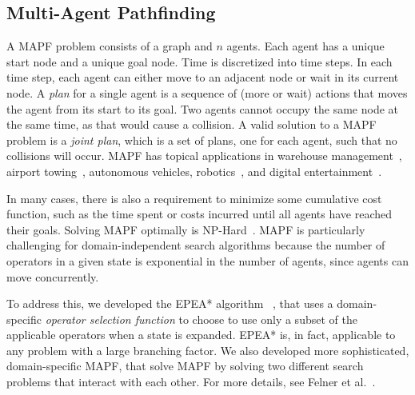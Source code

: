 \documentclass{article}
\newcommand{\astar}{A$^*$\xspace}
\newcommand{\epea}{\ac{EPEA*}\xspace}
\newcommand{\mapf}{\ac{MAPF}\xspace}
\begin{document}
\subsection{Multi-Agent Pathfinding}


A \mapf problem consists of a graph and $n$ agents. Each agent has a unique start node and a unique goal node. Time is discretized into time steps. In each time step, each agent can either move to an adjacent node or wait in its current node. A \emph{plan} for a single agent is a sequence of (more or wait) actions that moves the agent from its start  to its goal.  Two agents cannot occupy the same node at the same time, as that would cause a collision. 
A valid solution to a \mapf problem is a \emph{joint plan}, which is a 
set of plans, one for each agent, such that no collisions will occur. 
\mapf has topical applications in warehouse management~\cite{wurman2008coordinating}, airport towing~\cite{morris2016planning}, autonomous vehicles, robotics~\cite{veloso2015cobots}, and digital entertainment~\cite{ma2017feasibility}.


In many cases, there is also a requirement to minimize some cumulative cost function, such as the time spent or costs incurred until all agents have reached their goals. Solving \mapf optimally is NP-Hard~\cite{DBLP:conf/aaai/YuL13,DBLP:conf/aaai/Surynek10}. 
\mapf is particularly challenging for domain-independent search algorithms because the number of operators in a given state is exponential in the number of agents, since agents can move concurrently. %

To address this, we developed the \epea algorithm ~\cite{goldenberg2014enhanced}, that uses a domain-specific \emph{operator selection function} to choose to use only a subset of the applicable operators when a state is expanded. \epea is, in fact, applicable to any problem with a large branching factor. We also developed more sophisticated, domain-specific \mapf,  that solve \mapf by solving two different search problems that interact with each other. For more details, see Felner et al.~. 
\end{document}
